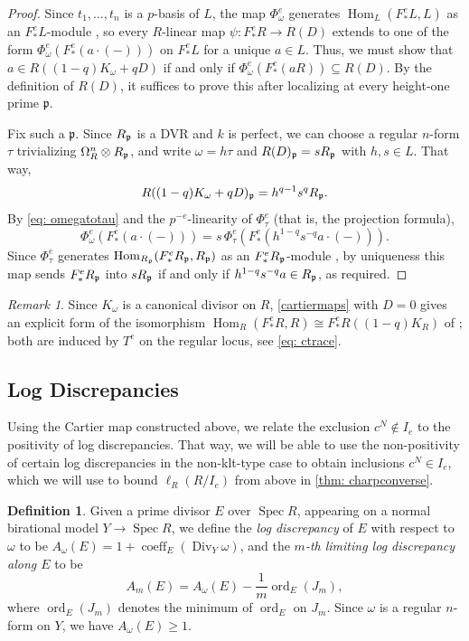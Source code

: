 \documentclass[11pt,leqno]{amsart}
\numberwithin{equation}{section}
\theoremstyle{definition}
\newtheorem{definition}[theorem]{Definition}
\theoremstyle{remark}
\newtheorem{remark}[theorem]{Remark}
\newcommand{\Spec}{\operatorname{Spec}}
\newcommand{\Div}{\operatorname{Div}}
\newcommand{\ord}{\operatorname{ord}}
\DeclareMathOperator{\Hom}{Hom}
\begin{document}
\begin{proof}
Since $t_1, \dots, t_n$ is a $p$-basis of $L$, the map $\Phi^e_\omega$ generates $\Hom_L(F^e_*L, L)$ as an $F^e_*L$-module \cite[Chapter 2, Corollary 1.16]{SSbook}, so every $R$-linear map $\psi: F^e_*R \to R(D)$ extends to one of the form $\Phi^e_\omega(F^e_*(a \cdot (-)))$ on $F^e_*L$ for a unique $a \in L$. Thus, we must show that $a \in R((1 - q)K_\omega + qD)$ if and only if $\Phi^e_\omega(F^e_*(aR)) \subseteq R(D)$. By the definition of $R(D)$, it suffices to prove this after localizing at every height-one prime $\mathfrak{p}$. 

Fix such a $\mathfrak{p}$. Since $R_{\frak{p}}$ is a DVR and $k$ is perfect, we can choose a regular $n$-form $\tau$ trivializing $\Omega^n_R \otimes R_{\frak{p}}$, and write $\omega = h\tau$ and $R(D)_\frak{p} = sR_\frak{p}$ with $h, s \in L$. That way, $$R((1-q)K_\omega + qD)_\frak{p} = h^{q-1}s^qR_\frak{p}.$$ By \cref{eq: omegatotau} and the $p^{-e}$-linearity of $\Phi^e_\tau$ (that is, the projection formula), $$\Phi^e_\omega(F^e_*(a \cdot (-))) = s\,\Phi^e_\tau(F^e_*(h^{1-q}s^{-q}a \cdot (-))).$$ Since $\Phi^e_\tau$ generates $\Hom_{R_\frak{p}}(F^e_*R_\frak{p}, R_\frak{p})$ as an $F^e_*R_\frak{p}$-module \cite[Chapter 2, Proposition 1.20]{SSbook}, by uniqueness this map sends $F^e_*R_\frak{p}$ into $sR_\frak{p}$ if and only if $h^{1-q}s^{-q}a \in R_\frak{p}$, as required.
\end{proof}

\begin{remark}
Since $K_\omega$ is a canonical divisor on $R$, \cref{cartiermaps} with $D = 0$ gives an explicit form of the isomorphism $\Hom_R(F^e_*R, R) \cong F^e_* R((1 - q)K_R)$ of \cite[Chapter 3, Theorem 2.25]{SSbook}; both are induced by $T^e$ on the regular locus, see \cref{eq: ctrace}.
\end{remark}


\subsection*{Log Discrepancies} Using the Cartier map constructed above, we relate the exclusion $c^N \notin I_e$ to the positivity of log discrepancies. That way, we will be able to use the non-positivity of certain log discrepancies in the non-klt-type case to obtain inclusions $c^N \in I_e$, which we will use to bound $\ell_R(R/I_e)$ from above in \cref{thm: charpconverse}.


\begin{definition} \label{def: limitinglogdisc}
Given a prime divisor $E$ over $\Spec R$, appearing on a normal birational model $Y \to \Spec R$, we define the \textit{log discrepancy} of $E$ with respect to $\omega$ to be $A_{\omega}(E) = 1 + \operatorname{coeff}_E(\Div_Y\omega)$, and the \textit{$m$-th limiting log discrepancy along $E$} to be $$A_m(E) = A_{\omega}(E) - \frac{1}{m}\ord_E(J_m),$$ where $\ord_E(J_m)$ denotes the minimum of $\ord_E$ on $J_m$. Since $\omega$ is a regular $n$-form on $Y$, we have $A_\omega(E) \geq 1$.
\end{definition}
\end{document}
